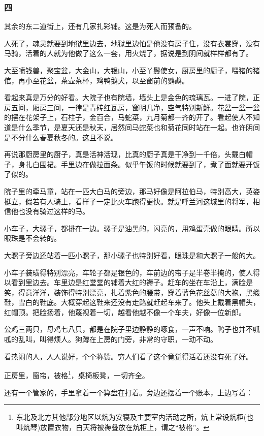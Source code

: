 \subsubsection*{四}
\par 其余的东二道街上，还有几家扎彩铺。这是为死人而预备的。
\par 人死了，魂灵就要到地狱里边去，地狱里边怕是他没有房子住，没有衣裳穿，没有马骑，活着的人就为他做了这么一套，用火烧了，据说是到阴间就样样都有了。
\par 大至喷钱兽，聚宝盆，大金山，大银山，小至丫鬟使女，厨房里的厨子，喂猪的猪倌，再小至花盆，茶壶茶杯，鸡鸭鹅犬，以至窗前的鹦鹉。
\par 看起来真是万分的好看。大院子也有院墙，墙头上是金色的琉璃瓦。一进了院，正房五间，厢房三间，一律是青砖红瓦房，窗明几净，空气特别新鲜。花盆一盆一盆的摆在花架子上，石柱子，金百合，马蛇菜，九月菊都一齐的开了。看起使人不知道是什么季节，是夏天还是秋天，居然间马蛇菜也和菊花同时站在一起。也许阴间是不分什么春夏秋冬的。这且不说。
\par 再说那厨房里的厨子，真是活神活现，比真的厨子真是干净到一千倍，头戴白帽子，身扎白围裙。手里边在做拉面条。似乎午饭的时候就要到了，煮了面就要开饭了似的。
\par 院子里的牵马童，站在一匹大白马的旁边，那马好像是阿拉伯马，特别高大，英姿挺立，假若有人骑上，看样子一定比火车跑得更快。就是呼兰河这城里的将军，相信他也没有骑过这样的马。
\par 小车子，大骡子，都排在一边。骡子是油黑的，闪亮的，用鸡蛋壳做的眼睛。所以眼珠是不会转的。
\par 大骡子旁边还站着一匹小骡子，那小骡子也特别好看，眼珠是和大骡子一般的大。
\par 小车子装璜得特别漂亮，车轮子都是银色的，车前边的帘子是半卷半掩的，使人得以看到里边去。车里边是红堂堂的铺着大红的褥子。赶车的坐在车沿上，满脸是笑，得意洋洋，装饰得特别漂亮，扎着紫色的腰带，穿着蓝色花丝葛的大袍，黑缎鞋，雪白的鞋底。大概穿起这鞋来还没有走路就赶起车来了。他头上戴着黑帽头，红帽顶。把脸扬着，他蔑视着一切，越看他越不像一个车夫，好像一位新郎。
\par 公鸡三两只，母鸡七八只，都是在院子里边静静的啄食，一声不响。鸭子也并不呱呱的乱叫，叫得烦人。狗蹲在上房的门旁，非常的守职，一动不动。
\par 看热闹的人，人人说好，个个称赞。穷人们看了这个竟觉得活着还没有死了好。
\par 正房里，窗帘，被格\footnote{东北及北方其他部分地区以炕为安寝及主要室内活动之所，炕上常设炕柜(也叫炕琴)放置衣物，白天将被褥叠放在炕柜上，谓之“被格”。}，桌椅板凳，一切齐全。
\par 还有一个管家的，手里拿着一个算盘在打着。旁边还摆着一个账本，上边写着：
